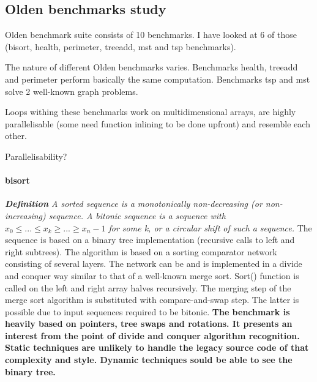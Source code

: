 \documentclass[10pt,a4paper]{report}
\begin{document}
\subsection{Olden benchmarks study}
\label{olden_benchmarks_study}
\quad Olden benchmark suite consists of 10 benchmarks. I have looked at 6 of those (bisort, health, perimeter, treeadd, mst and tsp benchmarks). 


The nature of different Olden benchmarks varies. Benchmarks health, treeadd and perimeter perform basically the same computation. Benchmarks tsp and mst solve 2 well-known graph problems.  

Loops withing these benchmarks work on multidimensional arrays, are highly parallelisable (some need function inlining to be done upfront) and resemble each other. 

Parallelisability?

\paragraph{bisort}
\textit{\textbf{Definition} A sorted sequence is a monotonically non-decreasing (or non-increasing) sequence. A bitonic sequence is a sequence with $x_{0} \leq ... \leq x_{k} \geq ... \geq x_{n}−1$ for some k, or a circular shift of such a sequence.}\newline\null
\quad The sequence is based on a binary tree implementation (recursive calls to left and right subtrees). The algorithm is based on a sorting comparator network consisting of several layers. The network can be and is implemented in a divide and conquer way similar to that of a well-known merge sort. Sort() function is called on the left and right array halves recursively. The merging step of the merge sort algorithm is substituted with compare-and-swap step. The latter is possible due to input sequences required to be bitonic.
\quad\textbf{The benchmark is heavily based on pointers, tree swaps and rotations. It presents an interest from the point of divide and conquer algorithm recognition. Static techniques are unlikely to handle the legacy source code of that complexity and style. Dynamic techniques sould be able to see the binary tree.}      
\end{document}
